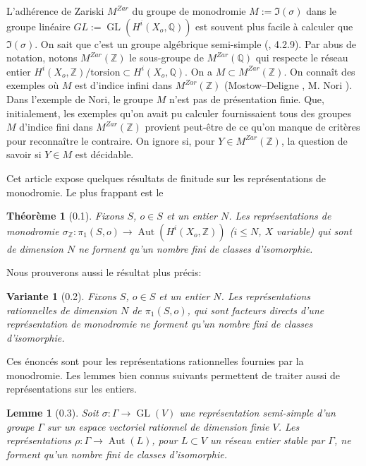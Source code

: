 \documentclass[12pt,a4paper]{article}
\theoremstyle{plain}
\newtheorem{theorem}{Th\'{e}or\`{e}me}[section]
\newtheorem{lemma}{Lemme}[section]
\newtheorem{variante}{Variante}[section]
\theoremstyle{definition}
\DeclareMathOperator{\Aut}{Aut}
\DeclareMathOperator{\GL}{GL}
\newcommand{\QQ}{\mathbb{Q}}
\newcommand{\ZZ}{\mathbb{Z}}
\begin{document}
L'adh\'{e}rence de Zariski $M^{Zar}$ du groupe de monodromie $M := \Im(\sigma)$ dans le groupe lin\'{e}aire $GL := \GL(H^{i}(X_{o}, \QQ))$ est souvent plus facile \`{a} calculer que $\Im(\sigma)$. On sait que c'est un groupe alg\'{e}brique semi-simple (\cite{HodgeII}, 4.2.9). Par abus de notation, notons $M^{Zar}(\ZZ)$ le sous-groupe de $M^{Zar}(\QQ)$ qui respecte le r\'{e}seau entier $H^{i}(X_{o}, \ZZ) / \text{torsion} \subset H^{i}(X_{o}, \QQ)$. On a $M \subset M^{Zar}(\ZZ)$. On conna\^{i}t des exemples o\`{u} $M$ est d'indice infini dans $M^{Zar}(\ZZ)$ (Mostow--Deligne \cite{Mostow}, M. Nori \cite{Nori}). Dans l'exemple de Nori, le groupe $M$ n'est pas de pr\'{e}sentation finie. Que, initialement, les exemples qu'on avait pu calculer fournissaient tous des groupes $M$ d'indice fini dans $M^{Zar}(\ZZ)$ provient peut-\^{e}tre de ce qu'on manque de crit\`{e}res pour reconna\^{i}tre le contraire. On ignore si, pour $Y \in M^{Zar}(\ZZ)$, la question de savoir si $Y \in M$ est d\'{e}cidable.

Cet article expose quelques r\'{e}sultats de finitude sur les repr\'{e}sentations de monodromie. Le plus frappant est le

\begin{theorem}[0.1]
Fixons $S$, $o \in S$ et un entier $N$. Les repr\'{e}sentations de monodromie $\sigma_{\ZZ} : \pi_{1}(S,o) \to \Aut(H^{i}(X_{o}, \ZZ))$ ($i \leq N$, $X$ variable) qui sont de dimension $N$ ne forment qu'un nombre fini de classes d'isomorphie.
\end{theorem}

Nous prouverons aussi le r\'{e}sultat plus pr\'{e}cis:

\begin{variante}[0.2]
Fixons $S$, $o \in S$ et un entier $N$. Les repr\'{e}sentations rationnelles de dimension $N$ de $\pi_{1}(S,o)$, qui sont facteurs directs d'une repr\'{e}sentation de monodromie ne forment qu'un nombre fini de classes d'isomorphie.
\end{variante}

Ces \'{e}nonc\'{e}s sont pour les repr\'{e}sentations rationnelles fournies par la monodromie. Les lemmes bien connus suivants permettent de traiter aussi de repr\'{e}sentations sur les entiers.

\begin{lemma}[0.3]
Soit $\sigma : \Gamma \to \GL(V)$ une repr\'{e}sentation semi-simple d'un groupe $\Gamma$ sur un espace vectoriel rationnel de dimension finie $V$. Les repr\'{e}sentations $\rho : \Gamma \to \Aut(L)$, pour $L \subset V$ un r\'{e}seau entier stable par $\Gamma$, ne forment qu'un nombre fini de classes d'isomorphie.
\end{lemma}
\end{document}
